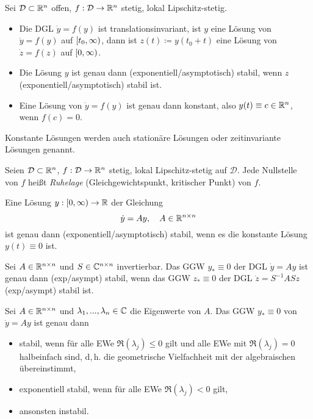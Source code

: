 \documentclass{cheat-sheet}
\newcommand{\D}{\mathcal{D}}
\begin{document}

\begin{satz}
  Sei $\D \subset \R^{n}$ offen, $f : \D \to \R^n$ stetig, lokal Lipschitz-stetig.
  \begin{itemize}
    \item Die DGL $\dot{y} = f(y)$ ist translationsinvariant, \dh{} ist $y$ eine Lösung von $\dot{y} = f(y)$ auf $\left[ t_0, \infty \right)$, dann ist $z(t) \coloneqq y(t_0 + t)$ eine Lösung von $\dot{z} = f(z)$ auf $\left[ 0, \infty \right)$.
    \item Die Lösung $y$ ist genau dann (exponentiell/asymptotisch) stabil, wenn $z$ (exponentiell/asymptotisch) stabil ist.
    \item Eine Lösung von $\dot{y} = f(y)$ ist genau dann konstant, also $y(t) \equiv c \in \mathbb{R}^n$, wenn $f(c) = 0$.
  \end{itemize}
\end{satz}

\begin{sprech}
  Konstante Lösungen werden auch stationäre Lösungen oder zeitinvariante Lösungen genannt.
\end{sprech}

\begin{defn}
  Seien $\D \subset \R^n$, $f : \D \to \R^n$ stetig, lokal Lipschitz-stetig auf $\D$. Jede Nullstelle von $f$ heißt \emph{Ruhelage} (Gleichgewichtspunkt, kritischer Punkt) von $f$.
\end{defn}


\begin{bem}
  Eine Lösung $y : \left[ 0, \infty \right) \to \mathbb{R}$ der Gleichung
  \[ \dot{y} = A y, \quad A \in \mathbb{R}^{n \times n} \]
  ist genau dann (exponentiell/asymptotisch) stabil, wenn es die konstante Lösung $y(t) \equiv 0$ ist.
\end{bem}


\begin{satz}
  Sei $A \in \mathbb{R}^{n \times n}$ und $S \in \mathbb{C}^{n \times n}$ invertierbar. Das GGW $y_* \equiv 0$ der DGL $\dot{y} = Ay$ ist genau dann (exp/asympt) stabil, wenn das GGW $z_* \equiv 0$ der DGL $\dot{z} = S^{-1} A S z$ (exp/asympt) stabil ist.
\end{satz}

\begin{satz}
  Sei $A \in \mathbb{R}^{n \times n}$ und $\lambda_1, ..., \lambda_n \in \mathbb{C}$ die Eigenwerte von $A$. Das GGW $y_* \equiv 0$ von $\dot{y} = Ay$ ist genau dann
  \begin{itemize}
    \item stabil, wenn für alle EWe $\Re(\lambda_j) \leq 0$ gilt und alle EWe mit $\Re(\lambda_j) = 0$ halbeinfach sind, d,\,h. die geometrische Vielfachheit mit der algebraischen übereinstimmt,
    \item exponentiell stabil, wenn für alle EWe $\Re(\lambda_j) < 0$ gilt,
    \item ansonsten instabil.
  \end{itemize}
\end{satz}
\end{document}
